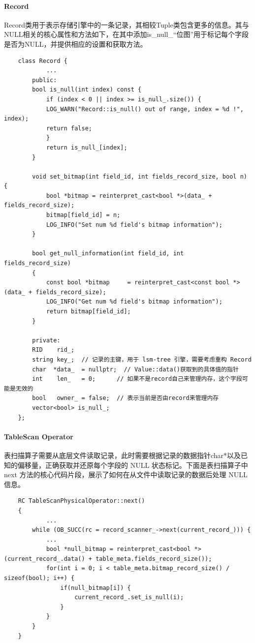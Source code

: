 \documentclass[a4paper, 12pt]{article}
\begin{document}
\paragraph{\textbf{Record}}
Record类用于表示存储引擎中的一条记录，其相较Tuple类包含更多的信息。其与NULL相关的核心属性和方法如下，在其中添加is\_null\_“位图”用于标记每个字段是否为NULL，并提供相应的设置和获取方法。
\begin{lstlisting}
    class Record {
            ...
        public:
        bool is_null(int index) const {
            if (index < 0 || index >= is_null_.size()) {
            LOG_WARN("Record::is_null() out of range, index = %d !", index);
            return false;
            }
            return is_null_[index]; 
        }

        void set_bitmap(int field_id, int fields_record_size, bool n) {
            bool *bitmap = reinterpret_cast<bool *>(data_ + fields_record_size);
            bitmap[field_id] = n;
            LOG_INFO("Set num %d field's bitmap information");
        }

        bool get_null_information(int field_id, int fields_record_size)
        {
            const bool *bitmap     = reinterpret_cast<const bool *>(data_ + fields_record_size);
            LOG_INFO("Get num %d field's bitmap information");
            return bitmap[field_id];
        }

        private:
        RID    rid_;
        string key_;  // 记录的主键，用于 lsm-tree 引擎，需要考虑重构 Record
        char  *data_  = nullptr;  // Value::data()获取到的具体值的指针
        int    len_   = 0;      // 如果不是record自己来管理内存，这个字段可能是无效的
        bool   owner_ = false;  // 表示当前是否由record来管理内存
        vector<bool> is_null_;
    };
\end{lstlisting}

\paragraph{\textbf{TableScan Operator}}
表扫描算子需要从底层文件读取记录，此时需要根据记录的数据指针char*以及已知的偏移量，正确获取并还原每个字段的 NULL 状态标记。下面是表扫描算子中 next 方法的核心代码片段，展示了如何在从文件中读取记录的数据后处理 NULL 信息。
\begin{lstlisting}
    RC TableScanPhysicalOperator::next()
    {
            ...
        while (OB_SUCC(rc = record_scanner_->next(current_record_))) {
            ...
            bool *null_bitmap = reinterpret_cast<bool *>(current_record_.data() + table_meta.fields_record_size());
            for(int i = 0; i < table_meta.bitmap_record_size() / sizeof(bool); i++) {
                if(null_bitmap[i]) {
                    current_record_.set_is_null(i);
                }
            }
        }
    }
\end{lstlisting}
\end{document}
